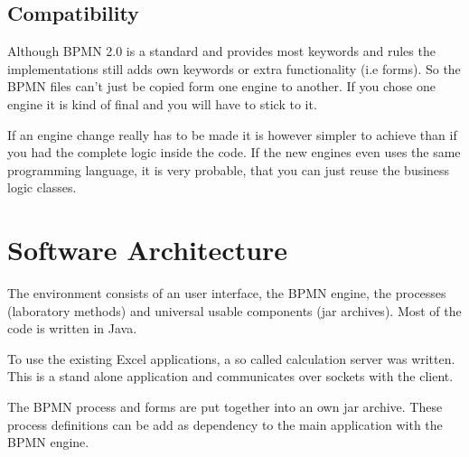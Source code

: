 \documentclass[paper=a4,twoside=false,BCOR=0mm,DIV=calc,fontsize=12pt]{scrartcl}
\begin{document}

\subsection{Compatibility}
Although BPMN 2.0 is a standard and provides most keywords and rules the implementations still adds own keywords or extra functionality (i.e forms). So the BPMN files can't just be copied form one engine to another. If you chose one engine it is kind of final and you will have to stick to it.

If an engine change really has to be made it is however simpler to achieve than if you had the complete logic inside the code. If the new engines even
uses the same programming language, it is very probable, that you can just reuse the business logic classes. 


\section{Software Architecture}
The environment consists of an user interface, the BPMN engine, the processes (laboratory methods) and universal usable components (jar archives). Most of the code is written in Java. 

To use the existing Excel applications, a so called calculation server was written. This is a stand alone application and communicates over sockets with the client.

The BPMN process and forms are put together into an own jar archive. These process definitions can be add as dependency to the main application with the BPMN engine.
\end{document}
